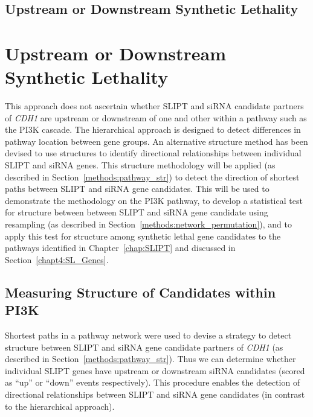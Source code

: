 \subsection{Upstream or Downstream Synthetic Lethality}
\fi
\section{Upstream or Downstream Synthetic Lethality}

This approach does not ascertain whether \gls{SLIPT} and \gls{siRNA} candidate partners of \textit{CDH1} are upstream or downstream of one and other within a pathway such as the \gls{PI3K} cascade. The hierarchical approach is designed to detect differences in pathway location between gene groups. An alternative  structure method has been devised to use  structures to identify directional relationships between individual \gls{SLIPT} and \gls{siRNA} genes. This  structure methodology will be applied (as described in Section~\ref{methods:pathway_str}) to detect the direction of \glspl{shortest path} between \gls{SLIPT} and \gls{siRNA} gene candidates. This will be used to demonstrate the methodology on the \gls{PI3K} pathway, to develop a statistical test for  structure between between \gls{SLIPT} and \gls{siRNA} gene candidate using resampling  (as described in Section~\ref{methods:network_permutation}), and to apply this test for  structure among \gls{synthetic lethal} gene candidates to the pathways identified in Chapter~\ref{chap:SLIPT} and discussed in Section~\ref{chapt4:SL_Genes}.

\FloatBarrier

\subsection{Measuring Structure of Candidates within PI3K}  \label{chapt4:Structure_PI3K}

Shortest paths in a pathway network were used to devise a strategy to detect  structure between \gls{SLIPT} and \gls{siRNA} gene candidate partners of \textit{CDH1} (as described in Section~\ref{methods:pathway_str}). Thus we can determine whether individual \gls{SLIPT} genes have upstream or downstream \gls{siRNA} candidates (scored as ``up'' or ``down'' events respectively). This procedure enables the detection of directional relationships between \gls{SLIPT} and \gls{siRNA} gene candidates (in contrast to the hierarchical approach).



